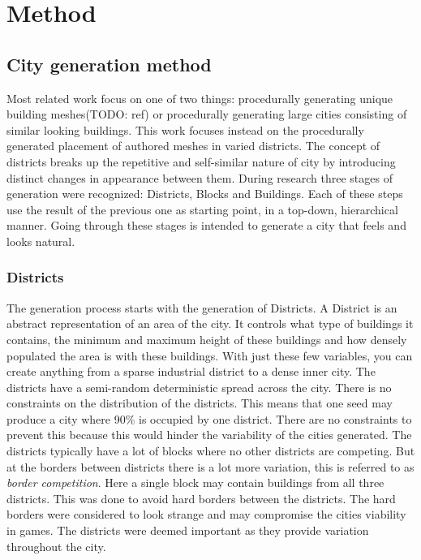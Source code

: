 \section{Method}

	\subsection{City generation method}
	Most related work focus on one of two things: procedurally generating unique building meshes(TODO: ref) or procedurally generating large cities consisting of similar looking buildings\cite{InfiniteCities}. This work focuses instead on the procedurally generated placement of authored meshes in varied districts. The concept of districts breaks up the repetitive and self-similar nature of city by introducing distinct changes in appearance between them. During research three stages of generation were recognized: Districts, Blocks and Buildings. Each of these steps use the result of the previous one as starting point, in a top-down, hierarchical manner. Going through these stages is intended to generate a city that feels and looks natural.

		\subsubsection{Districts}
		The generation process starts with the generation of Districts. A District is an abstract representation of an area of the city. It controls what type of buildings it contains, the minimum and maximum height of these buildings and how densely populated the area is with these buildings. With just these few variables, you can create anything from a sparse industrial district to a dense inner city. The districts have a semi-random deterministic spread across the city. There is no constraints on the distribution of the districts. This means that one seed may produce a city where 90\% is occupied by one district. There are no constraints to prevent this because this would hinder the variability of the cities generated. The districts typically have a lot of blocks where no other districts are competing. But at the borders between districts there is a lot more variation, this is referred to as \textit{border competition}. Here a single block may contain buildings from all three districts. This was done to avoid hard borders between the districts. The hard borders were considered to look strange and may compromise the cities viability in games. The districts were deemed important as they provide variation throughout the city.
		
